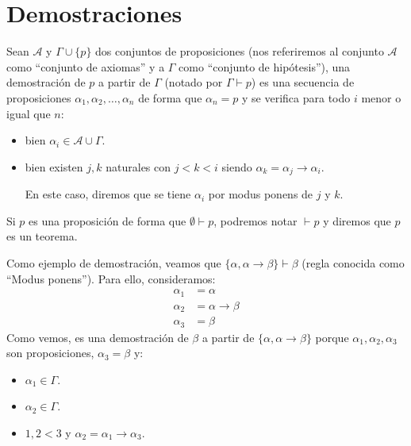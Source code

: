 
\section{Demostraciones}
\begin{definicion}[Demostración]
    Sean $\mathcal{A}$ y $\Gamma\cup\{p\}$ dos conjuntos de proposiciones (nos referiremos al conjunto $\mathcal{A}$ como ``conjunto de axiomas'' y a $\Gamma$ como ``conjunto de hipótesis''), una demostración de $p$ a partir de $\Gamma$ (notado por $\Gamma\vdash p$) es una secuencia de proposiciones $\alpha_1,\alpha_2,\ldots,\alpha_n$ de forma que $\alpha_n=p$ y se verifica para todo $i$ menor o igual que $n$:
    \begin{itemize}
        \item bien $\alpha_i \in \mathcal{A}\cup\Gamma$.
        \item bien existen $j,k$ naturales con $j<k<i$ siendo $\alpha_k = \alpha_j\to \alpha_i$.

        En este caso, diremos que se tiene $\alpha_i$ por modus ponens de $j$ y $k$.
    \end{itemize}
\end{definicion}

\begin{notacion}
    Si $p$ es una proposición de forma que $\emptyset \vdash p$, podremos notar $\vdash p$ y diremos que $p$ es un teorema.
\end{notacion}

\begin{ejemplo}
    Como ejemplo de demostración, veamos que $\{\alpha,\alpha\to\beta\}\vdash \beta$ (regla conocida como ``Modus ponens''). Para ello, consideramos:
    \begin{align*}
        \alpha_1 &= \alpha \\
        \alpha_2 &= \alpha\to\beta \\
        \alpha_3 &= \beta
    \end{align*}
    Como vemos, es una demostración de $\beta$ a partir de $\{\alpha,\alpha\to\beta\}$ porque $\alpha_1,\alpha_2,\alpha_3$ son proposiciones, $\alpha_3=\beta$ y:
    \begin{itemize}
        \item $\alpha_1\in \Gamma$.
        \item $\alpha_2\in \Gamma$.
        \item $1,2<3$ y $\alpha_2 = \alpha_1\to \alpha_3$.
    \end{itemize}
\end{ejemplo}

